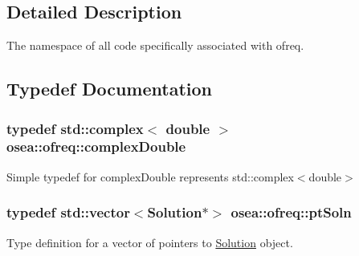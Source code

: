 \subsection{Detailed Description}
The namespace of all code specifically associated with ofreq. 

\subsection{Typedef Documentation}
\hypertarget{namespaceosea_1_1ofreq_a40cad4695a41123a7ae6ab0b6e8b1664}{
\subsubsection[{complex\-Double}]{\setlength{\rightskip}{0pt plus 5cm}typedef std\-::complex$<$ double $>$ {\bf osea\-::ofreq\-::complex\-Double}}}\label{namespaceosea_1_1ofreq_a40cad4695a41123a7ae6ab0b6e8b1664}
Simple typedef for complex\-Double represents std\-::complex$<$double$>$ \hypertarget{namespaceosea_1_1ofreq_a951464fca478bccfc9e5295910e5eec3}{
\subsubsection[{pt\-Soln}]{\setlength{\rightskip}{0pt plus 5cm}typedef std\-::vector$<${\bf Solution}$\ast$$>$ {\bf osea\-::ofreq\-::pt\-Soln}}}\label{namespaceosea_1_1ofreq_a951464fca478bccfc9e5295910e5eec3}
Type definition for a vector of pointers to \hyperlink{classosea_1_1ofreq_1_1_solution}{Solution} object. 
